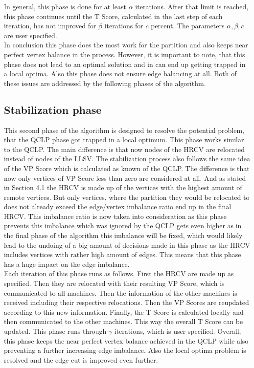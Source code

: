 \documentclass[acmsmall,nonacm,screen,review]{acmart}
\begin{document}
In general, this phase is done for at least $\alpha$ iterations. After that limit is reached, this phase continues until the T Score, calculated in the last step of each iteration, has not improved for $\beta$ iterations for $c$ percent. The parameters $\alpha,\beta,c$ are user specified.\\
In conclusion this phase does the most work for the partition and also keeps near perfect vertex balance in the process. However, it is important to note, that this phase does not lead to an optimal solution and in can end up getting trapped in a local optima. Also this phase does not ensure edge balancing at all. Both of these issues are addressed by the following phases of the algorithm.
\subsection{Stabilization phase}
This second phase of the algorithm is designed to resolve the potential problem, that the QCLP phase got trapped in a local optimum. This phase works similar to the QCLP. The main difference is that now nodes of the HRCV are relocated instead of nodes of the LLSV. The stabilization process also follows the same idea of the VP Score which is calculated as known of the QCLP. The difference is that now only vertices of VP Score less than zero are considered at all. And as stated in Section 4.1 the HRCV is made up of the vertices with the highest amount of remote vertices. But only vertices, where the partition they would be relocated to does not already exceed the edge/vertex imbalance ratio end up in the final HRCV. This imbalance ratio is now taken into consideration as this phase prevents this imbalance which was ignored by the QCLP gets even higher as in the final phase of the algorithm this imbalance will be fixed, which would likely lead to the undoing of a big amount of decisions made in this phase as the HRCV includes vertices with rather high amount of edges. This means that this phase has a huge impact on the edge imbalance.\\
Each iteration of this phase runs as follows. First the HRCV are made up as specified. Then they are relocated with their resulting VP Score, which is communicated to all machines. Then the information of the other machines is received including their respective relocations. Then the VP Scores are reupdated according to this new information. Finally, the T Score is calculated locally and then communicated to the other machines. This way the overall T Score can be updated. This phase runs through $\gamma$ iterations, which is user specified.
Overall, this phase keeps the near perfect vertex balance achieved in the QCLP while also preventing a further increasing edge imbalance. Also the local optima problem is resolved and the edge cut is improved even further.
\end{document}
